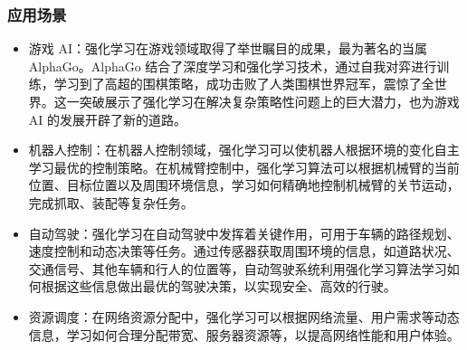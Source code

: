 \documentclass[12pt]{article}
\begin{document}
\subsubsection{应用场景}
\begin{itemize}
    \item 游戏 AI：强化学习在游戏领域取得了举世瞩目的成果，最为著名的当属 AlphaGo。AlphaGo 结合了深度学习和强化学习技术，通过自我对弈进行训练，学习到了高超的围棋策略，成功击败了人类围棋世界冠军，震惊了全世界。这一突破展示了强化学习在解决复杂策略性问题上的巨大潜力，也为游戏 AI 的发展开辟了新的道路。

    \item 机器人控制：在机器人控制领域，强化学习可以使机器人根据环境的变化自主学习最优的控制策略。在机械臂控制中，强化学习算法可以根据机械臂的当前位置、目标位置以及周围环境信息，学习如何精确地控制机械臂的关节运动，完成抓取、装配等复杂任务。

    \item 自动驾驶：强化学习在自动驾驶中发挥着关键作用，可用于车辆的路径规划、速度控制和动态决策等任务。通过传感器获取周围环境的信息，如道路状况、交通信号、其他车辆和行人的位置等，自动驾驶系统利用强化学习算法学习如何根据这些信息做出最优的驾驶决策，以实现安全、高效的行驶。

    \item 资源调度：在网络资源分配中，强化学习可以根据网络流量、用户需求等动态信息，学习如何合理分配带宽、服务器资源等，以提高网络性能和用户体验。

\end{itemize}
\end{document}
